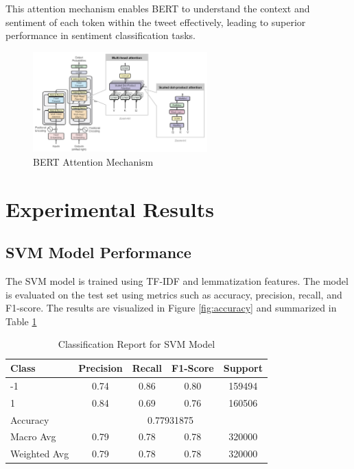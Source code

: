 \documentclass[12pt]{article}
\begin{document}
This attention mechanism enables BERT to understand the context and sentiment of each token within the tweet effectively, leading to superior performance in sentiment classification tasks.

\begin{figure}[h]
    \centering
    \includegraphics[width=0.6\textwidth]{WhatsApp Image 2024-05-29 at 14.31.19.jpeg}
    \caption{BERT Attention Mechanism}
    \label{fig:bert_attention}
\end{figure}

\section{Experimental Results}

\subsection{SVM Model Performance}
The SVM model is trained using TF-IDF and lemmatization features. The model is evaluated on the test set using metrics such as accuracy, precision, recall, and F1-score. The results are visualized in Figure \ref{fig:accuracy} and summarized in Table \ref{tab:classification_report}

\begin{table}[H]
    \centering
    \begin{tabular}{lcccc}
    \hline
    Class & Precision & Recall & F1-Score & Support \\
    \hline
    -1 & 0.74 & 0.86 & 0.80 & 159494 \\
    1 & 0.84 & 0.69 & 0.76 & 160506 \\
    \hline
    Accuracy & \multicolumn{4}{c}{0.77931875} \\
    Macro Avg & 0.79 & 0.78 & 0.78 & 320000 \\
    Weighted Avg & 0.79 & 0.78 & 0.78 & 320000 \\
    \hline
    \end{tabular}
    \caption{Classification Report for SVM Model}
    \label{tab:classification_report}
    \end{table}
\end{document}
